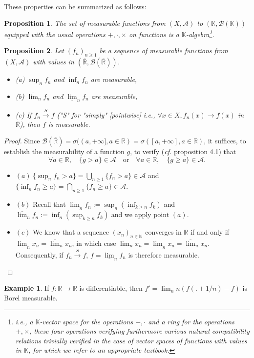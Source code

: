 \documentclass[12pt]{article}
\newtheorem{proposition}{Proposition}[section]
\theoremstyle{definition}
\newtheorem{example}{Example}[section]
\begin{document}
These properties can be summarized as follows:
\begin{proposition}
The set of measurable functions from $(X, \mathscr{A})$ to $(\mathbb{K}, \mathscr{B}(\mathbb{K}))$ equipped with the usual operations $+,\cdot,\times$ on functions is a $\mathbb{K}$-algebra\footnote{\textit{i.e.}, a $\mathbb{K}$-vector space for the operations $+,\cdot$ and a ring for the operations $+,\times$, these four operations verifying furthermore various natural compatibility relations trivially verified in the case of vector spaces of functions with values in $\mathbb{K}$, for which we refer to an appropriate textbook.}.
\end{proposition}

\begin{proposition}
Let $(f_n)_{n \geq 1}$ be a sequence of measurable functions from $(X, \mathscr{A})$ with values in $(\overline{\mathbb{R}}, \mathscr{B}(\overline{\mathbb{R}}))$.
\begin{itemize}
    \item (a) $\sup_n f_n$ and $\inf_n f_n$ are measurable,
    \item (b) $\overline{\lim}_n f_n$ and $\underline{\lim}_n f_n$ are measurable,
    \item (c) If $f_n \xrightarrow{S} f$ ("S" for "simply" [pointwise] i.e., $\forall x \in X, f_n(x) \to f(x)$ in $\overline{\mathbb{R}}$), then $f$ is measurable.
\end{itemize}
\end{proposition}
\begin{proof}
Since $\mathscr{B}(\overline{\mathbb{R}}) = \sigma((a, +\infty], a \in \mathbb{R}) = \sigma([a, +\infty], a \in \mathbb{R})$, it suffices, to establish the measurability of a function $g$, to verify (\textit{cf.} proposition 4.1) that
$$ \forall a \in \mathbb{R}, \quad \{g > a\} \in \mathscr{A} \quad \text{or} \quad \forall a \in \mathbb{R}, \quad \{g \geq a\} \in \mathscr{A}. $$

\begin{itemize}
\item $(a) \ \{\sup_n f_n > a\} = \bigcup_{n \geq 1} \{f_n > a\} \in \mathscr{A}$ and $\{\inf_n f_n \geq a\} = \bigcap_{n \geq 1} \{f_n \geq a\} \in \mathscr{A}.$

\item $(b)$ Recall that $\underline{\lim}_n f_n := \sup_n (\inf_{k \geq n} f_k)$ and $\overline{\lim}_n f_n := \inf_n (\sup_{k \geq n} f_k)$ and we apply point $(a)$.

\item $(c)$ We know that a sequence $(x_n)_{n \in \mathbb{N}}$ converges in $\overline{\mathbb{R}}$ if and only if $\underline{\lim}_n x_n = \overline{\lim}_n x_n$, in which case $\lim_n x_n = \underline{\lim}_n x_n = \overline{\lim}_n x_n$. Consequently, if $f_n \xrightarrow{S} f$, $f = \underline{\lim}_n f_n$ is therefore measurable.
\end{itemize}
\end{proof}
\begin{example}
If $f : \mathbb{R} \to \mathbb{R}$ is differentiable, then $f' = \lim_n n(f(. + 1/n) - f)$ is Borel measurable.
\end{example}
\end{document}
